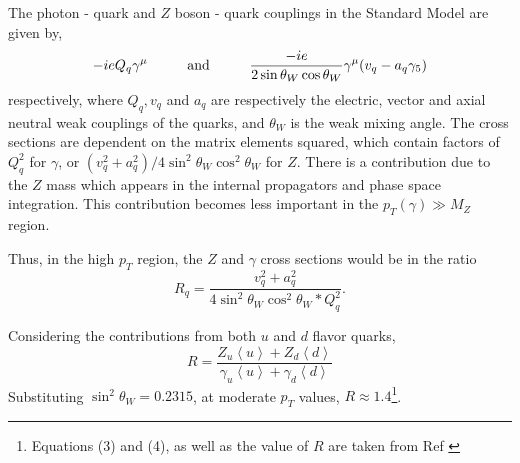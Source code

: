 \documentclass[11pt,a4paper,final]{report}
\begin{document}
The photon - quark and $Z$ boson - quark couplings in the Standard Model are given by,
\begin{equation}
	-ieQ_q\gamma^{\mu} \hspace{1 cm} \text{and} \hspace{1 cm}\frac{-ie}{2 \sin\theta_W \cos\theta_W}\gamma^{\mu}(v_q - a_q\gamma_5)
\end{equation}
respectively, where $Q_q,v_q$ and $a_q$ are respectively the electric, vector and axial neutral weak couplings of the quarks, and $\theta_W$ is the weak mixing angle. The cross sections are dependent on the matrix elements squared, which contain factors of $Q_q^2$ for $\gamma$, or $(v_q^2 + a_q^2)/4\sin^2 \theta_W \cos^2 \theta_W$ for $Z$. There is a contribution due to the $Z$ mass which appears in the internal propagators and phase space integration. This contribution becomes less important in the $p_T(\gamma)\gg M_Z$ region.

Thus, in the high $p_T$ region, the $Z$ and $\gamma$ cross sections would be in the ratio
\begin{equation}
	R_q = \frac{v_q^2 + a_q^2}{4\sin^2 \theta_W \cos^2 \theta_W * Q_q^2}.
\end{equation} 

Considering the contributions from both $u$ and $d$ flavor quarks,
\begin{equation}
	R = \frac{Z_u \left\langle u \right\rangle + Z_d \left\langle d\right\rangle}{\gamma_u \left\langle u\right\rangle + \gamma_d \left\langle d\right\rangle}
\end{equation}
Substituting $\sin^2 \theta_W = 0.2315$, at moderate $p_T$ values, $R \approx 1.4$\footnote{Equations (3) and (4), as well as the value of $R$ are taken from Ref \cite{gammajet}}.
\end{document}
